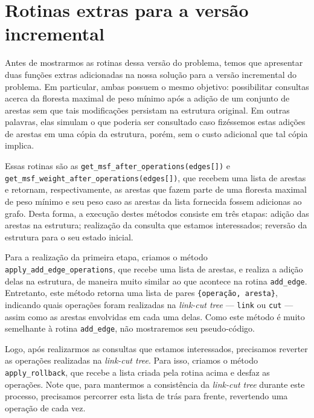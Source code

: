 \section{Rotinas extras para a versão incremental}
\label{sec:imsf-extras}

Antes de mostrarmos as rotinas dessa versão do problema, temos que apresentar duas funções extras adicionadas na nossa solução para a versão incremental do problema.  Em particular, ambas possuem o mesmo objetivo: possibilitar consultas acerca da floresta maximal de peso mínimo após a adição de um conjunto de arestas sem que tais modificações persistam na estrutura original. Em outras palavras, elas simulam o que poderia ser consultado caso fizéssemos estas adições de arestas em uma cópia da estrutura, porém, sem o custo adicional que tal cópia implica.

Essas rotinas são as \texttt{get\_msf\_after\_operations(edges[])} e \texttt{get\_msf\_weight\_after\_operations(edges[])}, que recebem uma lista de arestas e retornam, respectivamente, as arestas que fazem parte de uma floresta maximal de peso mínimo e seu peso caso as arestas da lista fornecida fossem adicionas ao grafo. Desta forma, a execução destes métodos consiste em três etapas: adição das arestas na estrutura; realização da consulta que estamos interessados; reversão da estrutura para o seu estado inicial.

Para a realização da primeira etapa, criamos o método \texttt{apply\_add\_edge\_operations}, que recebe uma lista de arestas, e realiza a adição delas na estrutura, de maneira muito similar ao que acontece na rotina \texttt{add\_edge}. Entretanto, este método retorna uma lista de pares \texttt{\{operação, aresta\}}, indicando quais operações foram realizadas na \emph{link-cut tree} --- \texttt{link} ou \texttt{cut} --- assim como as arestas envolvidas em cada uma delas. Como este método é muito semelhante à rotina \texttt{add\_edge}, não mostraremos seu pseudo-código.

Logo, após realizarmos as consultas que estamos interessados, precisamos reverter as operações realizadas na \emph{link-cut tree}. Para isso, criamos o método \texttt{apply\_rollback}, que recebe a lista criada pela rotina acima e desfaz as operações. Note que, para mantermos a consistência da \emph{link-cut tree} durante este processo, precisamos percorrer esta lista de trás para frente, revertendo uma operação de cada vez.

